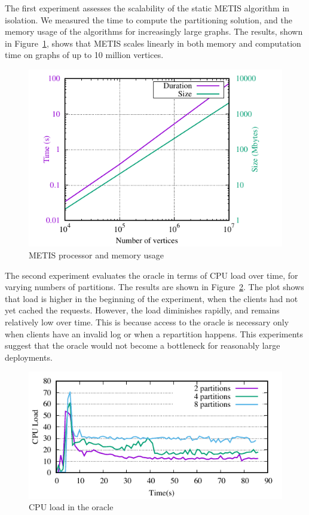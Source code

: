 The first experiment assesses the scalability of the static METIS algorithm
in isolation. We measured the time to compute the partitioning solution, and
the memory usage of the algorithms for increasingly large graphs. 
The results, shown in Figure~\ref{fig:metis_size_time}, shows that METIS scales
linearly in both memory and computation time on graphs of up to 10 million vertices.


\begin{figure}[ht!]
  \centering
    \includegraphics[width=\columnwidth]{figures/metis_size_time}
	\caption{METIS processor and memory usage}
	\label{fig:metis_size_time}
\end{figure}

The second experiment evaluates the oracle in terms of CPU load over
time, for varying numbers of partitions. The results are shown in
Figure~\ref{fig:cpu_oracle}. The plot shows that load is higher in the
beginning of the experiment, when the clients had not yet cached the
requests. However, the load diminishes rapidly, and remains relatively
low over time. This is because access to the oracle is necessary only
when clients have an invalid log or when a repartition happens. This experiments
suggest that the oracle would not become a bottleneck for reasonably large
deployments.

\begin{figure}[ht]
	\includegraphics{figures/experiments/oracle-load}
	\caption{CPU load in the oracle}
	\label{fig:cpu_oracle}
\end{figure}

